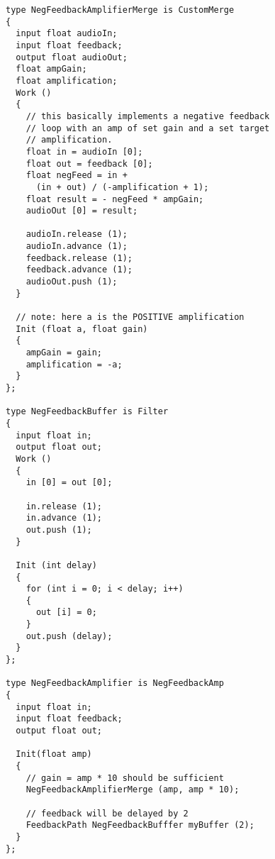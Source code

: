 \documentclass[twocolumn, draft]{article}
\begin{document}
\begin{verbatim}
type NegFeedbackAmplifierMerge is CustomMerge
{
  input float audioIn;
  input float feedback;
  output float audioOut;
  float ampGain;
  float amplification;
  Work ()
  {
    // this basically implements a negative feedback
    // loop with an amp of set gain and a set target
    // amplification.
    float in = audioIn [0];
    float out = feedback [0];
    float negFeed = in + 
      (in + out) / (-amplification + 1);
    float result = - negFeed * ampGain;
    audioOut [0] = result;
	
    audioIn.release (1);
    audioIn.advance (1);
    feedback.release (1);
    feedback.advance (1);
    audioOut.push (1);
  }

  // note: here a is the POSITIVE amplification
  Init (float a, float gain)
  {
    ampGain = gain;
    amplification = -a;
  }
};

type NegFeedbackBuffer is Filter
{
  input float in;
  output float out;
  Work ()
  {
    in [0] = out [0];

    in.release (1);
    in.advance (1);
    out.push (1);
  }

  Init (int delay)
  {
    for (int i = 0; i < delay; i++)
    {
      out [i] = 0;
    }
    out.push (delay);
  }
};

type NegFeedbackAmplifier is NegFeedbackAmp
{
  input float in;
  input float feedback;
  output float out;

  Init(float amp)
  {
    // gain = amp * 10 should be sufficient
    NegFeedbackAmplifierMerge (amp, amp * 10);

    // feedback will be delayed by 2 
    FeedbackPath NegFeedbackBufffer myBuffer (2);
  }
};

\end{verbatim}




%
\end{document}
